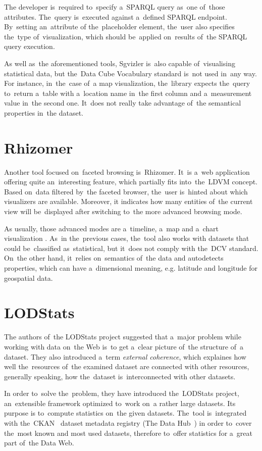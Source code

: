 The developer is~required to~specify a~SPARQL query as~one of~those attributes. The~query is~executed against a~defined SPARQL endpoint. By~setting an~attribute of
the~placeholder element, the~user also specifies the~type of~visualization, which 
should be~applied on~results of~the SPARQL query execution.

As well as~the aforementioned tools, Sgvizler is~also capable of~visualising statistical data, 
but the~Data Cube Vocabulary standard is~not used in~any way. For instance, in~the~case of~a map visualization, the~library expects the~query to~return a~table 
with a~location name in~the first column and a~measurement value in~the second 
one. It~does not really take advantage of~the semantical properties in~the 
dataset.

\section{Rhizomer}
Another tool focused on~faceted browsing is~Rhizomer. It~is a~web application 
offering quite an~interesting feature, which partially fits into~the~LDVM 
concept. Based on~data filtered by~the faceted browser, the~user is~hinted about
which visualizers are available. Moreover, 
it indicates how many entities of~the current view will be~displayed after 
switching to~the more advanced browsing mode.

As usually, those advanced modes are a~timeline, a~map and a~chart visualization . As~in the~previous cases, the~tool also works with datasets that could be~classified as~statistical, but it~does not comply with the~DCV standard. On~the 
other hand, it~relies on~semantics of~the data and autodetects properties, 
which can have a~dimensional meaning, e.g. latitude and longitude for geospatial data.

\section{LODStats}
The authors of~the LODStats project suggested that a~major 
problem while working with data on~the Web is~to get a~clear picture of~the 
structure of~a dataset. They also introduced a~term \emph{external coherence},
which explaines how well the~resources of~the examined dataset are connected with 
other resources, generally speaking, how the~dataset is~interconnected with 
other datasets.

In order to~solve the~problem, they have introduced the~LODStats project, an~extensible framework optimized to~work on~a rather large datasets. Its purpose 
is to~compute statistics on~the given datasets. The~tool is~integrated with the~CKAN~\cite{ckan} dataset metadata registry (The Data Hub~\cite{thedatahub})
in order to~cover the~most known and 
most used datasets, therefore to~offer statistics for a~great part of~the Data 
Web.

